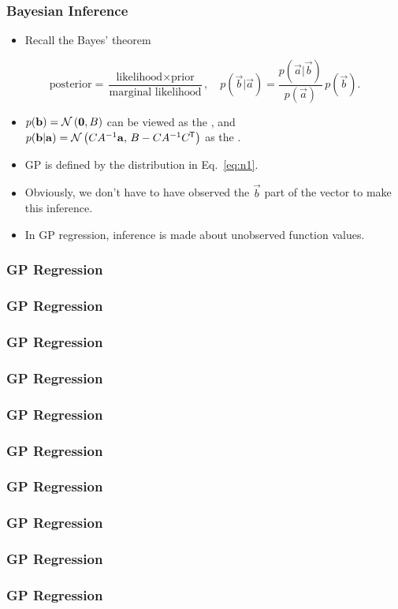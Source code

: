 \begin{frame} \frametitle{Bayesian Inference}
  \begin{itemize}
    \item Recall the Bayes' theorem
  \end{itemize}
  \vspace{1mm}
  \begin{equation}
    \text{posterior} =
    \frac{\text{likelihood}\times\text{prior}}{\text{marginal likelihood}},
    \quad
    p(\vec{b}|\vec{a}) = \frac{p(\vec{a}|\vec{b})}{p(\vec{a})}\,p(\vec{b}).
  \end{equation}
  \begin{itemize}
    \item $p(\mathbf{b}) = \mathcal{N}\left(\mathbf{0},B\right)$ can be viewed as the ,
      and $p(\mathbf{b}|\mathbf{a}) = \mathcal{N}\left(CA^{-1}\mathbf{a},\,B-CA^{-1}C^{\mkern-1.5mu\mathsf{T}}\right)$ as the
      .
    \vspace{1mm}
    \item GP is defined by the distribution in Eq.~\ref{eq:n1}.
    \vspace{1mm}
    \item Obviously, we don't have to have observed the $\vec{b}$ part of the
      vector to make this inference.
    \vspace{1mm}
    \item In GP regression, inference is made about unobserved function values.
  \end{itemize}
\end{frame}

\begin{frame} \frametitle{GP Regression}
\end{frame}

\begin{frame} \frametitle{GP Regression}
\end{frame}

\begin{frame} \frametitle{GP Regression}
\end{frame}

\begin{frame} \frametitle{GP Regression}
\end{frame}

\begin{frame} \frametitle{GP Regression}
\end{frame}

\begin{frame} \frametitle{GP Regression}
\end{frame}

\begin{frame} \frametitle{GP Regression}
\end{frame}

\begin{frame} \frametitle{GP Regression}
\end{frame}

\begin{frame} \frametitle{GP Regression}
\end{frame}

\begin{frame} \frametitle{GP Regression}
\end{frame}

